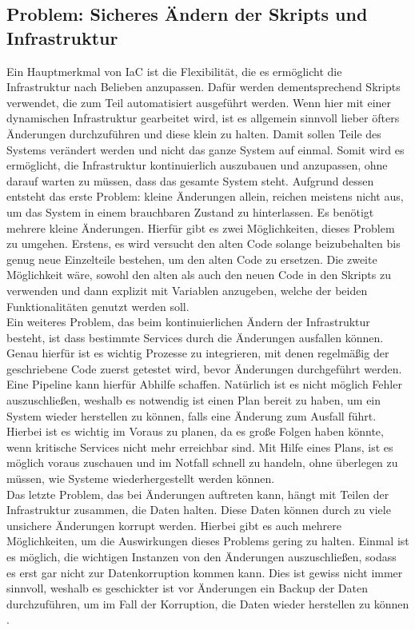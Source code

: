 \documentclass[biblatex]{lni}
\begin{document}
\subsection{Problem: Sicheres Ändern der Skripts und Infrastruktur}
Ein Hauptmerkmal von IaC ist die Flexibilität, die es ermöglicht die Infrastruktur nach Belieben anzupassen. Dafür werden dementsprechend Skripts verwendet, die zum Teil automatisiert ausgeführt werden. Wenn hier mit einer dynamischen Infrastruktur gearbeitet wird, ist es allgemein sinnvoll lieber öfters Änderungen durchzuführen und diese klein zu halten. Damit sollen Teile des Systems verändert werden und nicht das ganze System auf einmal. Somit wird es ermöglicht, die Infrastruktur kontinuierlich auszubauen und anzupassen, ohne darauf warten zu müssen, dass das gesamte System steht. Aufgrund dessen entsteht das erste Problem: kleine Änderungen allein, reichen meistens nicht aus, um das System in einem brauchbaren Zustand zu hinterlassen. Es benötigt mehrere kleine Änderungen. Hierfür gibt es zwei Möglichkeiten, dieses Problem zu umgehen. Erstens, es wird versucht den alten Code solange beizubehalten bis genug neue Einzelteile bestehen, um den alten Code zu ersetzen. Die zweite Möglichkeit wäre, sowohl den alten als auch den neuen Code in den Skripts zu verwenden und dann explizit mit Variablen anzugeben, welche der beiden Funktionalitäten genutzt werden soll.\\
Ein weiteres Problem, das beim kontinuierlichen Ändern der Infrastruktur besteht, ist dass bestimmte Services durch die Änderungen ausfallen können. Genau hierfür ist es wichtig Prozesse zu integrieren, mit denen regelmäßig der geschriebene Code zuerst getestet wird, bevor Änderungen durchgeführt werden. Eine Pipeline kann hierfür Abhilfe schaffen. Natürlich ist es nicht möglich Fehler auszuschließen, weshalb es notwendig ist einen Plan bereit zu haben, um ein System wieder herstellen zu können, falls eine Änderung zum Ausfall führt. Hierbei ist es wichtig im Voraus zu planen, da es große Folgen haben könnte, wenn kritische Services nicht mehr erreichbar sind. Mit Hilfe eines Plans, ist es möglich voraus zuschauen und im Notfall schnell zu handeln, ohne überlegen zu müssen, wie Systeme wiederhergestellt werden können.\\
Das letzte Problem, das bei Änderungen auftreten kann, hängt mit Teilen der Infrastruktur zusammen, die Daten halten. Diese Daten können durch zu viele unsichere Änderungen korrupt werden. Hierbei gibt es auch mehrere Möglichkeiten, um die Auswirkungen dieses Problems gering zu halten. Einmal ist es möglich, die wichtigen Instanzen von den Änderungen auszuschließen, sodass es erst gar nicht zur Datenkorruption kommen kann. Dies ist gewiss nicht immer sinnvoll, weshalb es geschickter ist vor Änderungen ein Backup der Daten durchzuführen, um im Fall der Korruption, die Daten wieder herstellen zu können \cite[S. 355-384]{Morris.December2020}.
\end{document}
